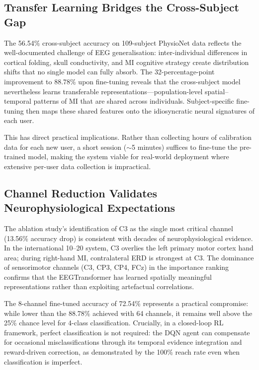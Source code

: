 \documentclass[12pt, a4paper]{article}
\begin{document}
\subsection{Transfer Learning Bridges the Cross-Subject Gap}

The 56.54\% cross-subject accuracy on 109-subject PhysioNet data reflects the well-documented challenge of EEG generalisation: inter-individual differences in cortical folding, skull conductivity, and MI cognitive strategy create distribution shifts that no single model can fully absorb. The 32-percentage-point improvement to 88.78\% upon fine-tuning reveals that the cross-subject model nevertheless learns transferable representations---population-level spatial--temporal patterns of MI that are shared across individuals. Subject-specific fine-tuning then maps these shared features onto the idiosyncratic neural signatures of each user.

This has direct practical implications. Rather than collecting hours of calibration data for each new user, a short session ($\sim$5 minutes) suffices to fine-tune the pre-trained model, making the system viable for real-world deployment where extensive per-user data collection is impractical.

\subsection{Channel Reduction Validates Neurophysiological Expectations}

The ablation study's identification of C3 as the single most critical channel (13.56\% accuracy drop) is consistent with decades of neurophysiological evidence. In the international 10--20 system, C3 overlies the left primary motor cortex hand area; during right-hand MI, contralateral ERD is strongest at C3. The dominance of sensorimotor channels (C3, CP3, CP4, FCz) in the importance ranking confirms that the EEGTransformer has learned spatially meaningful representations rather than exploiting artefactual correlations.

The 8-channel fine-tuned accuracy of 72.54\% represents a practical compromise: while lower than the 88.78\% achieved with 64 channels, it remains well above the 25\% chance level for 4-class classification. Crucially, in a closed-loop RL framework, perfect classification is not required: the DQN agent can compensate for occasional misclassifications through its temporal evidence integration and reward-driven correction, as demonstrated by the 100\% reach rate even when classification is imperfect.
\end{document}
